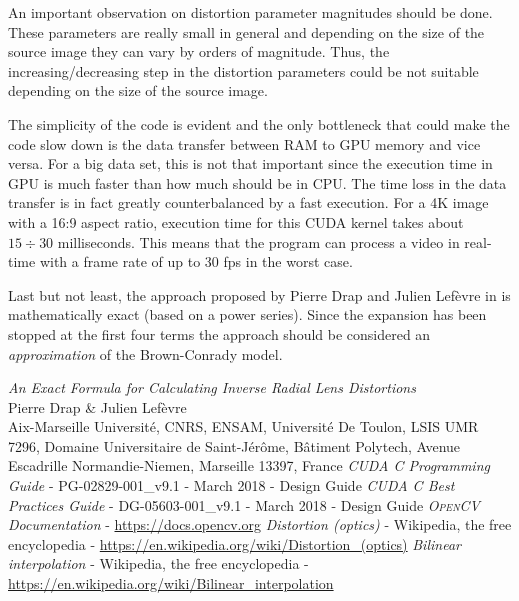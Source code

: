 \documentclass[12pt]{article}
\newcommand*{\Cuda}{\textsc{CUDA}}
\newcommand*{\OpenCV}{\textsc{OpenCV}}
\begin{document}
An important observation on distortion parameter magnitudes should be done. These parameters are really small in general and depending on the size of the source image they can vary by orders of magnitude. Thus, the increasing/decreasing step in the distortion parameters could be not suitable depending on the size of the source image.

The simplicity of the code is evident and the only bottleneck that could make the code slow down is the data transfer between RAM to GPU memory and vice versa. For a big data set, this is not that important since the execution time in GPU is much faster than how much should be in CPU. The time loss in the data transfer is in fact greatly counterbalanced by a fast execution. For a 4K image with a 16:9 aspect ratio, execution time for this \Cuda{} kernel takes about $15 \div 30$ milliseconds. This means that the program can process a video in real-time with a frame rate of up to 30 fps in the worst case.

Last but not least, the approach proposed by Pierre Drap and Julien Lefèvre in \cite{model} is mathematically exact (based on a power series). Since the expansion has been stopped at the first four terms the approach should be considered an \textit{approximation} of the Brown-Conrady model.
%
\vfill
%
\begin{thebibliography}{9}
   \textit{An Exact Formula for Calculating Inverse Radial Lens Distortions}\\
  Pierre Drap \& Julien Lefèvre\\ Aix-Marseille Université, CNRS, ENSAM, Université De Toulon, LSIS UMR 7296, Domaine Universitaire de Saint-Jérôme, Bâtiment Polytech, Avenue Escadrille Normandie-Niemen, Marseille 13397, France
   \textit{\Cuda{} C Programming Guide} - PG-02829-001\_v9.1 - March 2018 - Design Guide
   \textit{\Cuda{} C Best Practices Guide} - DG-05603-001\_v9.1 - March 2018 - Design Guide
   \textit{\OpenCV{} Documentation} - \url{https://docs.opencv.org}
   \textit{Distortion (optics)} - Wikipedia, the free encyclopedia - \url{https://en.wikipedia.org/wiki/Distortion_(optics)}
   \textit{Bilinear interpolation} - Wikipedia, the free encyclopedia - \url{https://en.wikipedia.org/wiki/Bilinear_interpolation}
\end{thebibliography}
%
\end{document}
